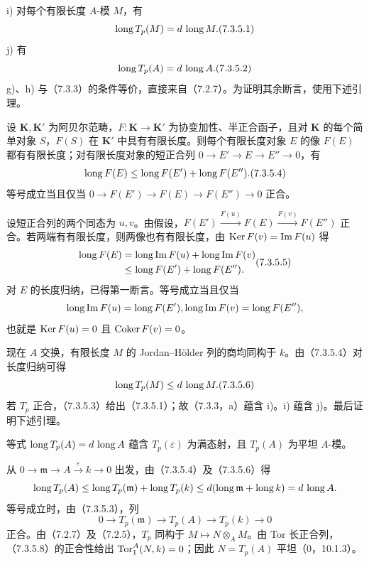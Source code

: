 \noindent i) 对每个有限长度 $A$-模 $M$，有
\begin{equation}
 \len T_p(M)=d\,\len M.\tag{7.3.5.1}
\end{equation}
\noindent j) 有
\begin{equation}
 \len T_p(A)=d\,\len A.\tag{7.3.5.2}
\end{equation}
g)、h) 与（7.3.3）的条件等价，直接来自（7.2.7）。为证明其余断言，使用下述引理。

设 $\mathbf K,\mathbf K'$ 为阿贝尔范畴，$F:\mathbf K\to\mathbf K'$ 为协变加性、半正合函子，且对 $\mathbf K$ 的每个简单对象 $S$，$F(S)$ 在 $\mathbf K'$ 中具有有限长度。则每个有限长度对象 $E$ 的像 $F(E)$ 都有有限长度；对有限长度对象的短正合列 $0\to E'\to E\to E''\to0$，有
\begin{equation}
 \len F(E)\leq\len F(E')+\len F(E'').\tag{7.3.5.4}
\end{equation}
等号成立当且仅当 $0\to F(E')\to F(E)\to F(E'')\to0$ 正合。

设短正合列的两个同态为 $u,v$。由假设，$F(E')\xrightarrow{F(u)}F(E)\xrightarrow{F(v)}F(E'')$ 正合。若两端有有限长度，则两像也有有限长度，由 $\operatorname{Ker} F(v)=\operatorname{Im} F(u)$ 得
\begin{equation}
 \begin{aligned}
 \len F(E)&=\len\Im F(u)+\len\Im F(v)\\
 &\leq\len F(E')+\len F(E'').
 \end{aligned}\tag{7.3.5.5}
\end{equation}
对 $E$ 的长度归纳，已得第一断言。等号成立当且仅当
\[
 \operatorname{long}\operatorname{Im} F(u)=\operatorname{long} F(E'),
 \operatorname{long}\operatorname{Im} F(v)=\operatorname{long} F(E''),
\]
也就是 $\operatorname{Ker} F(u)=0$ 且 $\operatorname{Coker} F(v)=0$。

现在 $A$ 交换，有限长度 $M$ 的 Jordan--Hölder 列的商均同构于 $k$。由（7.3.5.4）对长度归纳可得
\begin{equation}
 \len T_p(M)\leq d\,\len M.\tag{7.3.5.6}
\end{equation}
若 $T_p$ 正合，（7.3.5.3）给出（7.3.5.1）；故（7.3.3，a）蕴含 i)。i) 蕴含 j)。最后证明下述引理。

等式 $\operatorname{long} T_p(A)=d\,\operatorname{long} A$ 蕴含 $T_p(\varepsilon)$ 为满态射，且 $T_p(A)$ 为平坦 $A$-模。

从 $0\to\mathfrak m\to A\xrightarrow{\varepsilon}k\to0$ 出发，由（7.3.5.4）及（7.3.5.6）得
\[
 \operatorname{long} T_p(A)\leq\operatorname{long} T_p(\mathfrak m)+\operatorname{long} T_p(k)
 \leq d(\operatorname{long}\mathfrak m+\operatorname{long} k)=d\,\operatorname{long} A.
\]
等号成立时，由（7.3.5.3），列
\begin{equation}
 0\longrightarrow T_p(\mathfrak m)\longrightarrow T_p(A)
 \longrightarrow T_p(k)\longrightarrow0\tag{7.3.5.8}
\end{equation}
正合。由（7.2.7）及（7.2.5），$T_p$ 同构于 $M\mapsto N\otimes_A M$。由 Tor 长正合列，（7.3.5.8）的正合性给出 $\operatorname{Tor}_1^A(N,k)=0$；因此 $N=T_p(A)$ 平坦（0，10.1.3）。

